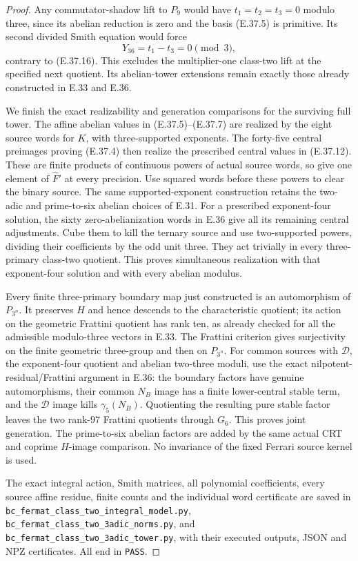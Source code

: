 \begin{proof}
Any commutator-shadow lift to $P_9$ would have
$t_1=t_2=t_3=0$ modulo three, since its abelian
reduction is zero and the basis
\textup{(E.37.5)} is primitive.
Its second divided Smith equation would force
\[
                   Y_{36}=t_1-t_3=0\pmod3,
 \tag{E.37.18}
\]
contrary to \textup{(E.37.16)}.
This excludes the multiplier-one class-two
lift at the specified next quotient.
Its abelian-tower extensions remain exactly
those already constructed in E.33 and E.36.

We finish the exact realizability and generation
comparisons for the surviving full tower.
The affine abelian values in
\textup{(E.37.5)--(E.37.7)} are realized by
the eight source words for $K$, with
three-supported exponents.
The forty-five central preimages proving
\textup{(E.37.4)} then realize the prescribed
central values in \textup{(E.37.12)}.
These are finite products of continuous powers
of actual source words, so give one element
of $\widehat F'$ at every precision.
Use squared words before these powers to
clear the binary source.
The same supported-exponent construction
retains the two-adic and prime-to-six abelian
choices of E.31.
For a prescribed exponent-four solution,
the sixty zero-abelianization words in E.36
give all its remaining central adjustments.
Cube them to kill the ternary source and
use two-supported powers, dividing their
coefficients by the odd unit three.
They act trivially in every three-primary
class-two quotient.  This proves simultaneous
realization with that exponent-four solution
and with every abelian modulus.

Every finite three-primary boundary map just
constructed is an automorphism of $P_{3^n}$.
It preserves $H$ and hence descends to the
characteristic quotient; its action on the
geometric Frattini quotient has rank ten,
as already checked for all the admissible
modulo-three vectors in E.33.
The Frattini criterion gives surjectivity
on the finite geometric three-group and
then on $P_{3^n}$.
For common sources with $\mathscr D$,
the exponent-four quotient and abelian
two-three moduli, use the exact
nilpotent-residual/Frattini argument in
E.36: the boundary factors have genuine
automorphisms, their common $N_B$ image
has a finite lower-central stable term,
and the $\mathscr D$ image kills
$\gamma_5(N_B)$.
Quotienting the resulting pure stable
factor leaves the two rank-$97$
Frattini quotients through $G_6$.
This proves joint generation.
The prime-to-six abelian factors are added
by the same actual CRT and coprime
$H$-image comparison.  No invariance of
the fixed Ferrari source kernel is used.

The exact integral action, Smith matrices,
all polynomial coefficients, every source
affine residue, finite counts and the
individual word certificate are saved in
\texttt{bc\_fermat\_class\_two\_integral\_model.py},
\texttt{bc\_fermat\_class\_two\_3adic\_norms.py},
and \texttt{bc\_fermat\_class\_two\_3adic\_tower.py},
with their executed outputs, JSON and NPZ
certificates.  All end in \texttt{PASS}.
\end{proof}
